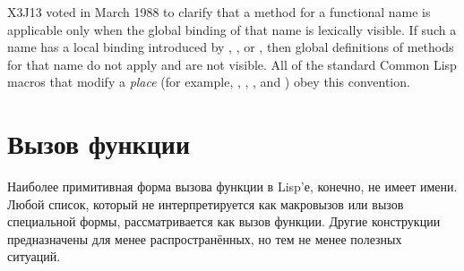 \begin{newer}
X3J13 voted in March 1988 
to clarify that a  method for a functional name is applicable
only when the global binding of that name is lexically visible.
If such a name has a local binding introduced by , ,
or , then global definitions of  methods for
that name do not apply and are not visible.  All of the standard Common Lisp
macros that modify a  \emph{place} (for example,
, , , and ) obey this convention.
\end{newer}

\section{Вызов функции}

Наиболее примитивная форма вызова функции в Lisp'е, конечно, не имеет
имени. Любой список, который не интерпретируется как макровызов или вызов
специальной формы, рассматривается как вызов функции.
Другие конструкции предназначены для менее распространённых, но тем не менее
полезных ситуаций.

